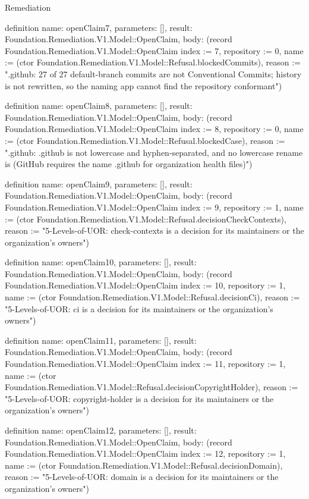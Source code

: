 \begin{lexlean}{Remediation}
\begin{semanticmodule}
definition{
  name: openClaim7,
  parameters: [],
  result: Foundation.Remediation.V1.Model::OpenClaim,
  body: (record Foundation.Remediation.V1.Model::OpenClaim {index := 7, repository := 0, name := (ctor Foundation.Remediation.V1.Model::Refusal.blockedCommits), reason := ".github: 27 of 27 default-branch commits are not Conventional Commits; history is not rewritten, so the naming app cannot find the repository conformant"})
}

definition{
  name: openClaim8,
  parameters: [],
  result: Foundation.Remediation.V1.Model::OpenClaim,
  body: (record Foundation.Remediation.V1.Model::OpenClaim {index := 8, repository := 0, name := (ctor Foundation.Remediation.V1.Model::Refusal.blockedCase), reason := ".github: .github is not lowercase and hyphen-separated, and no lowercase rename is (GitHub requires the name .github for organization health files)"})
}

definition{
  name: openClaim9,
  parameters: [],
  result: Foundation.Remediation.V1.Model::OpenClaim,
  body: (record Foundation.Remediation.V1.Model::OpenClaim {index := 9, repository := 1, name := (ctor Foundation.Remediation.V1.Model::Refusal.decisionCheckContexts), reason := "5-Levels-of-UOR: check-contexts is a decision for its maintainers or the organization's owners"})
}

definition{
  name: openClaim10,
  parameters: [],
  result: Foundation.Remediation.V1.Model::OpenClaim,
  body: (record Foundation.Remediation.V1.Model::OpenClaim {index := 10, repository := 1, name := (ctor Foundation.Remediation.V1.Model::Refusal.decisionCi), reason := "5-Levels-of-UOR: ci is a decision for its maintainers or the organization's owners"})
}

definition{
  name: openClaim11,
  parameters: [],
  result: Foundation.Remediation.V1.Model::OpenClaim,
  body: (record Foundation.Remediation.V1.Model::OpenClaim {index := 11, repository := 1, name := (ctor Foundation.Remediation.V1.Model::Refusal.decisionCopyrightHolder), reason := "5-Levels-of-UOR: copyright-holder is a decision for its maintainers or the organization's owners"})
}

definition{
  name: openClaim12,
  parameters: [],
  result: Foundation.Remediation.V1.Model::OpenClaim,
  body: (record Foundation.Remediation.V1.Model::OpenClaim {index := 12, repository := 1, name := (ctor Foundation.Remediation.V1.Model::Refusal.decisionDomain), reason := "5-Levels-of-UOR: domain is a decision for its maintainers or the organization's owners"})
}


\end{semanticmodule}
\end{lexlean}
